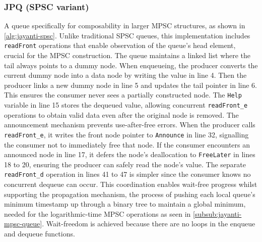 \subsubsection{\ac{JPQ} (\ac{SPSC} variant)}\label{subsub:jayanti-spsc-queue}
A queue specifically for composability in larger \ac{MPSC} structures, as shown in \cref{alg:jayanti-spsc}. Unlike traditional \ac{SPSC} queues, this implementation includes \texttt{readFront} operations that enable observation of the queue's head element, crucial for the \ac{MPSC} construction. The queue maintains a linked list where the tail always points to a dummy node. When enqueueing, the producer converts the current dummy node into a data node by writing the value in line 4. Then the producer links a new dummy node in line 5 and updates the tail pointer in line 6. This ensures the consumer never sees a partially constructed node. The \texttt{Help} variable in line 15 stores the dequeued value, allowing concurrent \texttt{readFront\_e} operations to obtain valid data even after the original node is removed. The announcement mechanism prevents use-after-free errors. When the producer calls \texttt{readFront\_e}, it writes the front node pointer to \texttt{Announce} in line 32, signalling the consumer not to immediately free that node. If the consumer encounters an announced node in line 17, it defers the node's deallocation to \texttt{FreeLater} in lines 18 to 20, ensuring the producer can safely read the node's value. The separate \texttt{readFront\_d} operation in lines 41 to 47 is simpler since the consumer knows no concurrent dequeue can occur. This coordination enables wait-free progress whilst supporting the propagation mechanism, the process of pushing each local queue's minimum timestamp up through a binary tree to maintain a global minimum, needed for the logarithmic-time \ac{MPSC} operations as seen in \cref{subsub:jayanti-mpsc-queue}. Wait-freedom is achieved because there are no loops in the enqueue and dequeue functions. \cite{JayantiLog}

